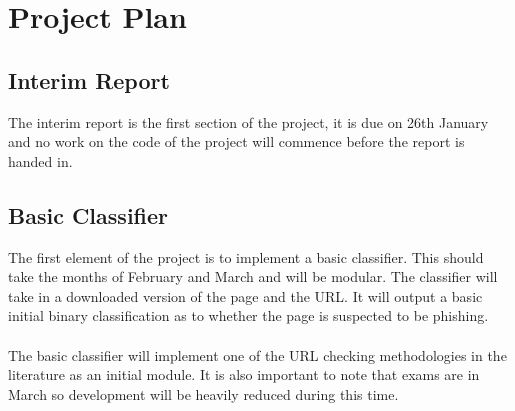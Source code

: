 \section{Project Plan}
\subsection{Interim Report}
The interim report is the first section of the project, it is due on 26th January and no work on the code of the project will commence before the report is handed in.
\subsection{Basic Classifier}
The first element of the project is to implement a basic classifier. This should take the months of February and March and will be modular. The classifier will take in a downloaded version of the page and the URL. It will output a basic initial binary classification as to whether the page is suspected to be phishing.
\\\\
The basic classifier will implement one of the URL checking methodologies in the literature as an initial module. It is also important to note that exams are in March so development will be heavily reduced during this time.
